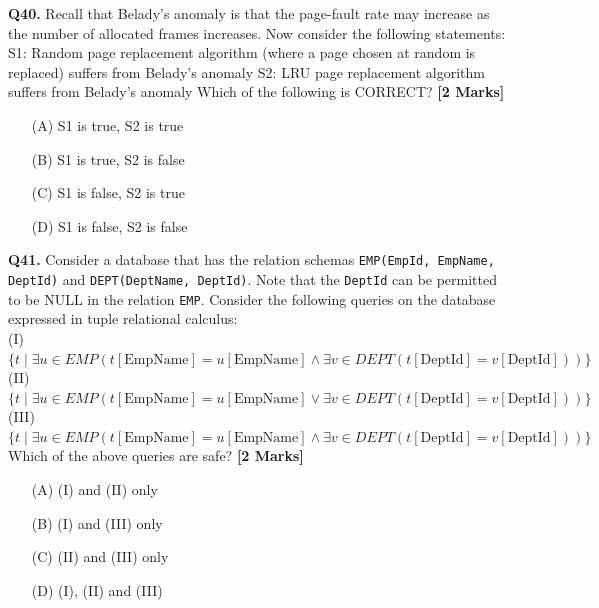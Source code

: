 \documentclass[11pt]{article}
\newcommand{\questionb}[2]{
    \noindent\textbf{Q#2.} #1 \hfill \textbf{[2 Marks]}
}
\begin{document}
\questionb{Recall that Belady’s anomaly is that the page-fault rate may increase as the number of allocated frames increases.  
Now consider the following statements:  
S1: Random page replacement algorithm (where a page chosen at random is replaced) suffers from Belady’s anomaly  
S2: LRU page replacement algorithm suffers from Belady’s anomaly  
Which of the following is CORRECT?}{40}
\begin{enumerate}
    \item[(A)] S1 is true, S2 is true  
    \item[(B)] S1 is true, S2 is false  
    \item[(C)] S1 is false, S2 is true  
    \item[(D)] S1 is false, S2 is false  
\end{enumerate}
\vspace{0.5cm}

\questionb{Consider a database that has the relation schemas \texttt{EMP(EmpId, EmpName, DeptId)} and  
\texttt{DEPT(DeptName, DeptId)}. Note that the \texttt{DeptId} can be permitted to be NULL in the relation \texttt{EMP}.  
Consider the following queries on the database expressed in tuple relational calculus:  
\\ (I) \( \{t \mid \exists u \in EMP (t[\text{EmpName}] = u[\text{EmpName}] \land \exists v \in DEPT (t[\text{DeptId}] = v[\text{DeptId}]))\} \)  
\\ (II) \( \{t \mid \exists u \in EMP (t[\text{EmpName}] = u[\text{EmpName}] \lor \exists v \in DEPT (t[\text{DeptId}] = v[\text{DeptId}]))\} \)  
\\ (III) \( \{t \mid \exists u \in EMP (t[\text{EmpName}] = u[\text{EmpName}] \land \exists v \in DEPT (t[\text{DeptId}] = v[\text{DeptId}]))\} \)  
Which of the above queries are safe?}{41}
\begin{enumerate}
    \item[(A)] (I) and (II) only  
    \item[(B)] (I) and (III) only  
    \item[(C)] (II) and (III) only  
    \item[(D)] (I), (II) and (III)  
\end{enumerate}
\vspace{0.5cm}
\end{document}
